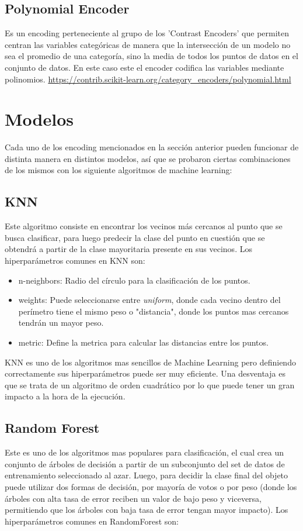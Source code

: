 \documentclass[12pt,a4paper]{article}
\begin{document}
\subsection{Polynomial Encoder}
Es un encoding perteneciente al grupo de los 'Contrast Encoders' que permiten centran las variables categóricas de manera que la intersección de un modelo no sea el promedio de una categoría, sino la media de todos los puntos de datos en el conjunto de datos.
En este caso este el encoder codifica las variables mediante polinomios. 
\url{https://contrib.scikit-learn.org/category_encoders/polynomial.html}
\newpage
\section{Modelos}
Cada uno de los encoding mencionados en la sección anterior pueden funcionar de distinta manera en distintos modelos, así que se probaron ciertas combinaciones de los mismos con los siguiente algoritmos de machine learning:

\subsection{KNN}
Este algoritmo consiste en encontrar los vecinos más cercanos al punto que se busca clasificar, para luego predecir la clase del punto en cuestión que se obtendrá a partir de la clase mayoritaria presente en sus vecinos.
Los hiperparámetros comunes en KNN son:
\begin{itemize}
    \item n-neighbors: Radio del círculo para la clasificación de los puntos.
    
    \item weights: Puede seleccionarse entre \textit{uniform}, donde cada vecino dentro del perímetro tiene el mismo peso o "distancia", donde los puntos mas cercanos tendrán un mayor peso.
    
    \item metric: Define la metrica para calcular las distancias entre los puntos.
    
\end{itemize}
KNN es uno de los algoritmos mas sencillos de Machine Learning pero definiendo correctamente sus hiperparámetros puede ser muy eficiente. Una desventaja es que se trata de un algoritmo de orden cuadrático por lo que puede tener un gran impacto a la hora de la ejecución.

\subsection{Random Forest}
Este es uno de los algoritmos mas populares para clasificación, el cual crea un conjunto de árboles de decisión a partir de un subconjunto del set de datos de entrenamiento seleccionado al azar. 
Luego, para decidir la clase final del objeto puede utilizar dos formas de decisión, por mayoría de votos o por peso (donde los árboles con alta tasa de error reciben un valor de bajo peso y viceversa, permitiendo que los árboles con baja tasa de error tengan mayor impacto).
Los hiperparámetros comunes en RandomForest son:
\end{document}
